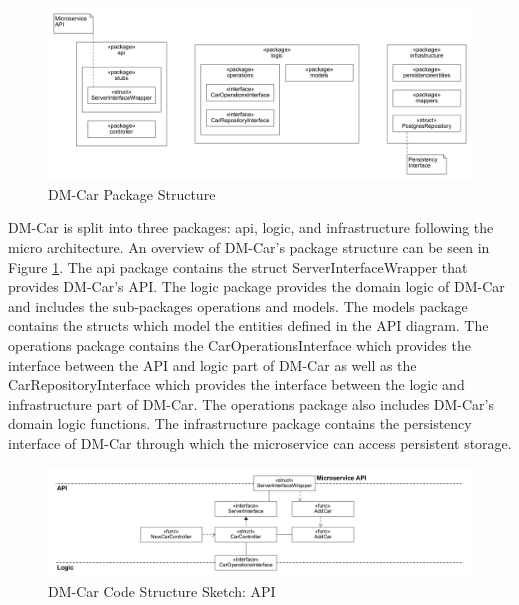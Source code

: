 \begin{figure}[tb]
	\centering
	\includegraphics[width=\textwidth]{figures/dm_car_package_structure.png}
	\caption{DM-Car Package Structure}
	\label{fig:dm_car_package_structure}
\end{figure}

DM-Car is split into three packages: api, logic, and infrastructure following
the micro architecture. An overview of DM-Car's package structure can be
seen in Figure \ref{fig:dm_car_package_structure}. The api package contains the
struct ServerInterfaceWrapper that provides DM-Car's API.
The logic package provides the domain logic of DM-Car and includes the sub-packages
operations and models. The models package contains the structs
which model the entities defined in the API diagram. The operations
package contains the CarOperationsInterface which provides the interface
between the API and logic part of DM-Car as well as the CarRepositoryInterface
which provides the interface between the logic and infrastructure part of DM-Car.
The operations package also includes DM-Car's domain logic functions.
The infrastructure package contains the persistency interface of DM-Car through which the
microservice can access persistent storage.

\begin{figure}[tb]
	\centering
	\includegraphics[width=\textwidth]{figures/dm_car_css_api.png}
	\caption{DM-Car Code Structure Sketch: API}
	\label{fig:dm_car_css_api}
\end{figure}

